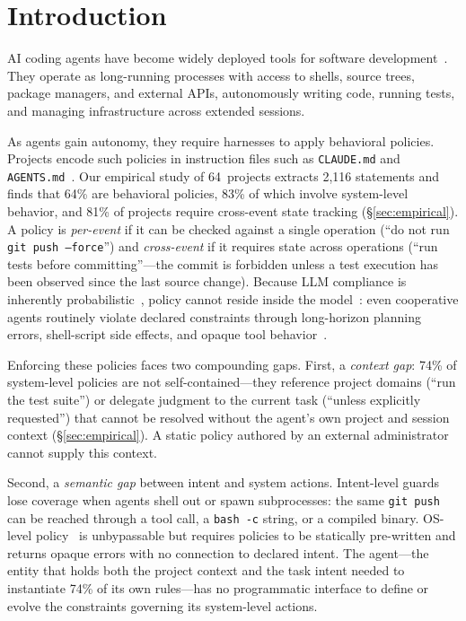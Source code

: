 \section{Introduction}


AI coding agents have become widely deployed tools for software
development~\cite{agentsight}. They operate as long-running processes with
access to shells, source trees, package managers, and external APIs,
autonomously writing code, running tests, and managing infrastructure across
extended sessions.

As agents gain autonomy, they require harnesses to apply behavioral
policies. Projects encode such policies in instruction files such
as \texttt{CLAUDE.md} and
\texttt{AGENTS.md}~\cite{chatlatanagulchai2025manifests,lulla2026agentsmd}.
Our empirical study of 64~projects extracts 2{,}116 statements and finds
that 64\% are behavioral policies, 83\% of which involve system-level
behavior, and 81\% of projects require cross-event state tracking
(\S\ref{sec:empirical}).
A policy is \emph{per-event} if it can be checked against a single
operation (``do not run \texttt{git push --force}'') and
\emph{cross-event} if it requires state across operations (``run tests
before committing''---the commit is forbidden unless a test execution
has been observed since the last source change).
Because LLM compliance is inherently
probabilistic~\cite{liu2024lost}, policy cannot reside inside the
model~\cite{langchain-harness,fowler-harness}: even cooperative agents
routinely violate declared constraints through long-horizon planning
errors, shell-script side effects, and opaque tool
behavior~\cite{jimenez2024swebench}.

Enforcing these policies faces two compounding gaps. First, a
\emph{context gap}: 74\% of system-level policies are not
self-contained---they reference project domains (``run the test suite'')
or delegate judgment to the current task (``unless explicitly
requested'') that cannot be resolved without the agent's own project
and session context (\S\ref{sec:empirical}). A static policy authored
by an external administrator cannot supply this context.

Second, a \emph{semantic gap} between intent and system actions.
Intent-level guards~\cite{wang2025agentspec,shi2025progent} lose coverage
when agents shell out or spawn subprocesses:
the same \texttt{git~push} can be reached through a tool call, a
\texttt{bash~-c} string, or a compiled binary.
OS-level policy~\cite{ciliumtetragon,flume,pasquier2018camquery} is
unbypassable but requires policies to be statically pre-written
and returns opaque errors with no connection to declared intent.
The agent---the entity that holds both the project context and the
task intent needed to instantiate 74\% of its own rules---has no
programmatic interface to define or evolve the constraints governing
its system-level actions.

